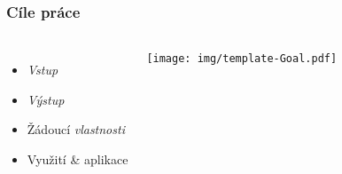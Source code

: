 
\begin{frame}
  \frametitle{Cíle práce}
  \begin{columns}
    \begin{itemize}
        \item \emph{Vstup}
        \item \emph{Výstup}
        \item Žádoucí \emph{vlastnosti}
        \item Využití \& aplikace
    \end{itemize}
     
        \texttt{[image: img/template-Goal.pdf]}
  \end{columns}
\end{frame}





